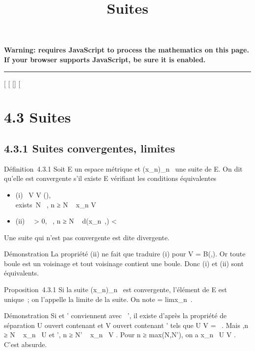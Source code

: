 \documentclass[]{article}
\title{Suites}
\author{}
\date{}
\begin{document}
\maketitle

\textbf{Warning: 
requires JavaScript to process the mathematics on this page.\\ If your
browser supports JavaScript, be sure it is enabled.}

\begin{center}\rule{3in}{0.4pt}\end{center}

[
[
[]
[

\section{4.3 Suites}

\subsection{4.3.1 Suites convergentes, limites}

Définition~4.3.1 Soit E un espace métrique et
(x_n)_n\in{}~ une suite de E. On dit qu'elle est
convergente s'il existe \ell \in E vérifiant les conditions équivalentes

\begin{itemize}
\itemsep1pt\parskip0pt
\item
  (i) \forall~V \in V (\ell), \\exists~N
  \in {}~, n ≥ N \rigtharrow~ x_n \in V
\item
  (ii) \forall~~\epsilon > 0,
  \existsN \in {}~, n ≥ N \rigtharrow~ d(x_n~,\ell)
  < \epsilon
\end{itemize}

Une suite qui n'est pas convergente est dite divergente.

Démonstration La propriété (ii) ne fait que traduire (i) pour V =
B(\ell,\epsilon). Or toute boule est un voisinage et tout voisinage contient une
boule. Donc (i) et (ii) sont équivalents.

Proposition~4.3.1 Si la suite (x_n)_n\in{}~ est
convergente, l'élément \ell de E est unique~; on l'appelle la limite de la
suite. On note \ell = limx_n~.

Démonstration Si \ell et \ell' conviennent avec \ell\neq~\ell', il existe d'après la
propriété de séparation U ouvert contenant \ell et V ouvert contenant \ell'
tels que U \bigcap V = \varnothing~. Mais
\existsN,\quad n ≥ N \rigtharrow~ x_n~ \in
U et \existsN', n ≥ N' \rigtharrow~ x_n~ \in V . Pour n
≥ max(N,N'), on a x_n~ \in U \bigcap V . C'est
absurde.
\end{document}
